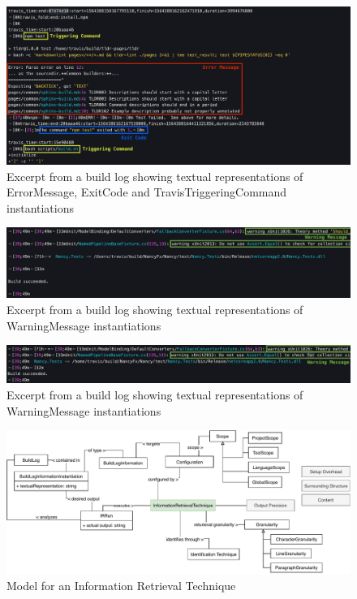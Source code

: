\documentclass[\myrootdir/main.tex]{subfiles}
\begin{document}
\begin{figure}[htbp]
	\centering
	\includegraphics[width=\textwidth, clip]{img/log3.png}
	\caption{Excerpt from a build log showing textual representations of ErrorMessage, ExitCode and TravisTriggeringCommand instantiations}
	\label{fig:log-3}
\end{figure}
\begin{figure}[htbp]
	\centering
	\includegraphics[width=\textwidth, clip]{img/log4.png}
	\caption{Excerpt from a build log showing textual representations of WarningMessage instantiations}
	\label{fig:log-4}
\end{figure}
\begin{figure}[htbp]
	\centering
	\includegraphics[width=\textwidth, clip]{img/log5.png}
	\caption{Excerpt from a build log showing textual representations of WarningMessage instantiations}
	\label{fig:log-5}
\end{figure}


\begin{figure}[htbp]
	\centering
	\includegraphics[width=\textwidth, clip]{img/ir-technique.pdf}
	\caption{Model for an Information Retrieval Technique}
	\label{fig:model-ie-technique}
\end{figure}
\end{document}
